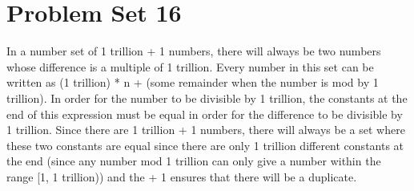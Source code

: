\documentclass[12pt]{article}
\begin{document}
\section*{Problem Set 16}
    In a number set of 1 trillion + 1 numbers, there will always be two numbers whose
    difference is a multiple of 1 trillion. Every number in this set can be written as
    (1 trillion) * n + (some remainder when the number is mod by 1 trillion). In order
    for the number to be divisible by 1 trillion, the constants at the end of this
    expression must be equal in order for the difference to be divisible by 1 trillion.
    Since there are 1 trillion + 1 numbers, there will always be a set where these two
    constants are equal since there are only 1 trillion different constants at the end
    (since any number mod 1 trillion can only give a number within the range [1,
    1 trillion)) and the + 1 ensures that there will be a duplicate.
\end{document}
